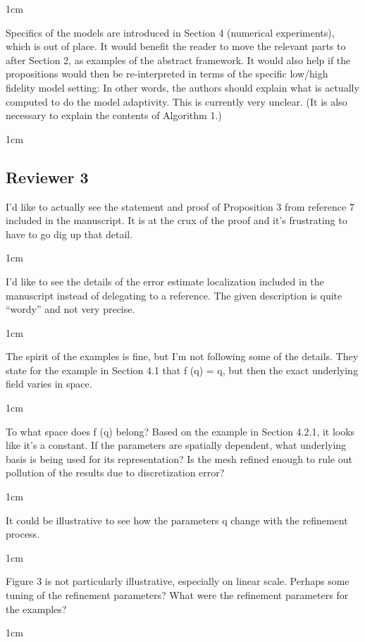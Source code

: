 \documentclass[12pt, letterpaper]{article}
\newcommand{\answer}[1]{\begin{adjustwidth}{1cm}{}{\color{blue}#1}\end{adjustwidth}}
\newcommand{\notdone}{{\color{red}{Changes not yet made.}}}
\begin{document}
\answer{}
\notdone

Specifics of the models are introduced in Section 4 (numerical experiments), which is out of place. It would benefit the reader to move the relevant parts to after Section 2, as examples of the abstract framework. It would also help if the propositions would then be re-interpreted in terms of the specific low/high fidelity model setting: In other words, the authors should explain what is actually computed to do the model adaptivity. This is currently very unclear. (It is also necessary to explain the contents of Algorithm 1.)

\answer{}
\notdone


\subsection*{Reviewer 3}

I’d like to actually see the statement and proof of Proposition 3 from reference 7 included in
the manuscript. It is at the crux of the proof and it’s frustrating to have to go dig up that
detail.

\answer{}
\notdone

I’d like to see the details of the error estimate localization included in the manuscript instead
of delegating to a reference. The given description is quite “wordy” and not very precise.

\answer{}
\notdone

The spirit of the examples is fine, but I’m not following some of the details. They state for
the example in Section 4.1 that f (q) = q, but then the exact underlying field varies in space.

\answer{}
\notdone

To what space does f (q) belong? Based on the example in Section 4.2.1, it looks like it’s
a constant. If the parameters are spatially dependent, what underlying basis is being used
for its representation? Is the mesh refined enough to rule out pollution of the results due to
discretization error?

\answer{}
\notdone

It could be illustrative to see how the parameters q change with the refinement process.

\answer{}
\notdone

Figure 3 is not particularly illustrative, especially on linear scale. Perhaps some tuning of the
refinement parameters? What were the refinement parameters for the examples?

\answer{}
\notdone
\end{document}
